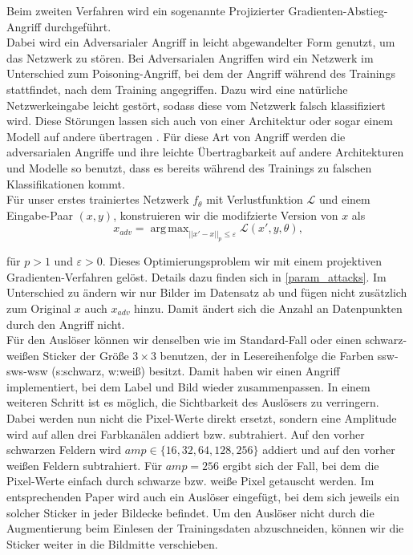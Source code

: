 \documentclass[11pt,a4paper]{article}
\DeclareMathOperator*{\argmax}{arg\,max}
\numberwithin{equation}{section}
\begin{document}
	Beim zweiten Verfahren wird ein sogenannte Projizierter Gradienten-Abstieg-Angriff durchgeführt.\\
	Dabei wird ein Adversarialer Angriff in leicht abgewandelter Form genutzt, um das Netzwerk zu stören. Bei Adversarialen Angriffen wird ein Netzwerk im Unterschied zum Poisoning-Angriff, bei dem der Angriff während des Trainings stattfindet, nach dem Training angegriffen. Dazu wird eine natürliche Netzwerkeingabe leicht gestört, sodass diese vom Netzwerk falsch klassifiziert wird. Diese Störungen lassen sich auch von einer Architektur oder sogar einem Modell auf andere übertragen \cite{szegedy2013intriguing, papernot2016transferability}.
	Für diese Art von Angriff werden die adversarialen Angriffe und ihre leichte Übertragbarkeit auf andere Architekturen und Modelle so benutzt, dass es bereits während des Trainings zu falschen Klassifikationen kommt.\\
	Für unser erstes trainiertes Netzwerk $f_\theta$ mit Verlustfunktion $\mathcal{L}$ und einem Eingabe-Paar $(x,y)$, konstruieren wir die modifzierte Version von $x$ als
	\begin{equation}
	x_{adv} = \argmax_{||x'-x||_p \leq \varepsilon}{\mathcal{L}(x',y,\theta)},
	\end{equation}
	
	für $p >1 $ und $\varepsilon > 0$. Dieses Optimierungsproblem wir mit einem projektiven Gradienten-Verfahren \cite{madry2017towards} gelöst. Details dazu finden sich in \autoref{param_attacks}. Im Unterschied zu \cite{labelconsistent} ändern wir nur Bilder im Datensatz ab und fügen nicht zusätzlich zum Original $x$ auch $x_{adv}$ hinzu. Damit ändert sich die Anzahl an Datenpunkten durch den Angriff nicht.\\
	
	
	Für den Auslöser können wir denselben wie im Standard-Fall oder einen schwarz-weißen Sticker der Größe $3\times 3$ benutzen, der in Lesereihenfolge die Farben ssw-
	sws-wsw (s:schwarz, w:weiß) besitzt. Damit haben wir einen Angriff implementiert,	bei dem Label und Bild wieder zusammenpassen.
	In einem weiteren Schritt ist es möglich, die Sichtbarkeit des Auslösers zu verringern. Dabei werden nun nicht die Pixel-Werte direkt ersetzt, sondern eine Amplitude wird auf allen drei Farbkanälen addiert bzw. subtrahiert. Auf den vorher schwarzen Feldern wird $amp \in\lbrace 16, 32, 64, 128, 256 \rbrace$ addiert und auf den  vorher weißen Feldern subtrahiert. Für $amp = 256$ ergibt sich der Fall, bei dem die Pixel-Werte einfach durch schwarze bzw. weiße Pixel getauscht werden. Im entsprechenden Paper \cite{labelconsistent} wird auch ein Auslöser eingefügt, bei dem	sich jeweils ein solcher Sticker in jeder Bildecke befindet. Um den Auslöser nicht durch die Augmentierung beim Einlesen der Trainingsdaten abzuschneiden, können
	wir die Sticker weiter in die Bildmitte verschieben.
	
\end{document}
